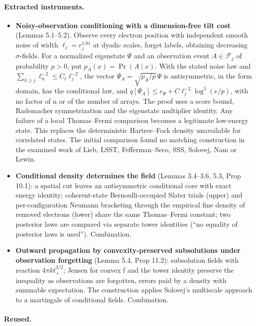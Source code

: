 \documentclass[11pt]{article}
\begin{document}
\paragraph{Extracted instruments.}

\begin{itemize}
\item \textbf{Noisy-observation conditioning with a dimension-free tilt cost} (Lemmas 5.1--5.2). Observe every electron position with independent smooth noise of width $\ell_j=r_j^{1.01}$ at dyadic scales, forget labels, obtaining decreasing $\sigma$-fields. For a normalized eigenstate $\Psi$ and an observation event $A\in\mathcal F_j$ of probability $p>0$, put $p_A(x)=\Pr(A\mid x)$. With the stated noise law and $\sum_{h\ge j}\ell_h^{-2}\le C_\ell\ell_j^{-2}$, the vector $\Psi_A=\sqrt{p_A/p}\,\Psi$ is antisymmetric, in the form domain, has the conditional law, and $q[\Psi_A]\le e_\Psi+C\ell_j^{-2}\log^5(e/p)$, with no factor of n or of the number of arrays. The proof uses a score bound, Rademacher symmetrization and the eigenstate multiplier identity. Any failure of a local Thomas--Fermi comparison becomes a legitimate low-energy state. This replaces the deterministic Hartree--Fock density unavailable for correlated states. The initial comparison found no matching construction in the examined work of Lieb, LSST, Fefferman--Seco, SSS, Solovej, Nam or Lewin.
\item \textbf{Conditional density determines the field} (Lemmas 3.4--3.6, 5.3, Prop 10.1): a spatial cut leaves an antisymmetric conditional core with exact energy identity; coherent-state Bernoulli-occupied Slater trials (upper) and per-configuration Neumann bracketing through the empirical fine density of removed electrons (lower) share the same Thomas--Fermi constant; two posterior laws are compared via separate tower identities (``no equality of posterior laws is used''). Combination.
\item \textbf{Outward propagation by convexity-preserved subsolutions under observation forgetting} (Lemma 5.4, Prop 11.2): subsolution fields with reaction $4\pi kt_+^{3/2}$; Jensen for convex f and the tower identity preserve the inequality as observations are forgotten, errors paid by a density with summable expectation. The construction applies Solovej's multiscale approach to a martingale of conditional fields. Combination.
\end{itemize}

\paragraph{Reused.}
\end{document}
